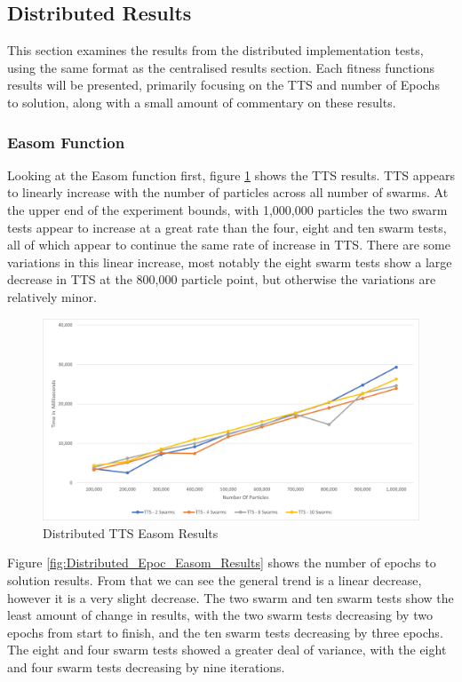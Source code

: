 \documentclass[oneside,12pt]{book}
\begin{document}
\subsection{Distributed Results}
This section examines the results from the distributed implementation tests, using the same format as the centralised results section. Each fitness functions results will be presented, primarily focusing on the TTS and number of Epochs to solution, along with a small amount of commentary on these results. 

\subsubsection{Easom Function}
Looking at the Easom function first, figure \ref{fig:Distributed_TTS_Easom_Results} shows the TTS results. TTS appears to linearly increase with the number of particles across all number of swarms. At the upper end of the experiment bounds, with 1,000,000 particles the two swarm tests appear to increase at a great rate than the four, eight and ten swarm tests, all of which appear to continue the same rate of increase in TTS. There are some variations in this linear increase, most notably the eight swarm tests show a large decrease in TTS at the 800,000 particle point, but otherwise the variations are relatively minor. 

\begin{figure}[H]
    \centering
    \includegraphics[scale=0.45]{Images/Graphs/DistributedEasomTTS.png}
    \caption{Distributed TTS Easom Results}
    \label{fig:Distributed_TTS_Easom_Results}
\end{figure}

Figure \ref{fig:Distributed_Epoc_Easom_Results} shows the number of epochs to solution results. From that we can see the general trend is a linear decrease, however it is a very slight decrease. The two swarm and ten swarm tests show the least amount of change in results, with the two swarm tests decreasing by two epochs from start to finish, and the ten swarm tests decreasing by three epochs. The eight and four swarm tests showed a greater deal of variance, with the eight and four swarm tests decreasing by nine iterations.
\end{document}

